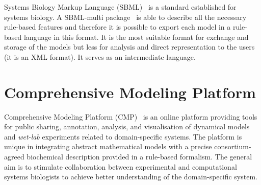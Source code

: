 \documentclass[12pt, twoside]{fithesis2} %
\begin{document}
Systems Biology Markup Language (SBML)~\cite{hucka2003systems} is a standard established for systems biology. A SBML-multi package~\cite{zhang2015sbml} is able to describe all the necessary rule-based features and therefore it is possible to export each model in a rule-based language in this format. It is the most suitable format for exchange and storage of the models but less for analysis and direct representation to the users (it is an XML format). It serves as an intermediate language.

\section{Comprehensive Modeling Platform}
\label{cmp}

Comprehensive Modeling Platform (CMP)~\cite{cs2bio2013} is an online platform providing tools for public sharing, annotation, analysis, and visualisation of dynamical models and \emph{wet-lab} experiments related to domain-specific systems. The platform is unique in integrating abstract mathematical models with a precise consortium-agreed biochemical description provided in a rule-based formalism. The general aim is to stimulate collaboration between experimental and computational systems biologists to achieve better understanding of the domain-specific system.
\end{document}
